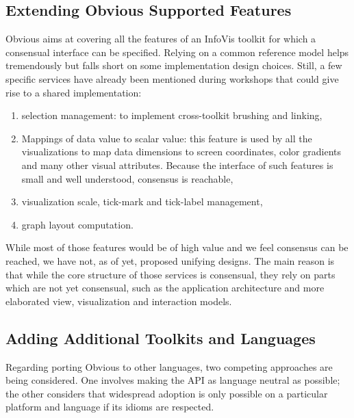 
\subsection{Extending Obvious Supported Features}

Obvious aims at covering all the features of an InfoVis toolkit for
which a consensual interface can be specified.  Relying on a common
reference model helps tremendously but falls short on some
implementation design choices.  Still, a few specific services have
already been mentioned during workshops that could give rise to a
shared implementation:
\begin{enumerate}[noitemsep,topsep=0pt]
\item selection management: to implement cross-toolkit brushing and
  linking,
\item Mappings of data value to scalar value: this feature is used by
  all the visualizations to map data dimensions to screen coordinates,
  color gradients and many other visual attributes. Because the
  interface of such features is small and well understood, consensus
  is reachable,
\item visualization scale, tick-mark and tick-label management,
\item graph layout computation.
\end{enumerate}

While most of those features would be of high value and we feel
consensus can be reached, we have not, as of yet, proposed unifying
designs.  The main reason is that while the core structure of those
services is consensual, they rely on parts which are not yet
consensual, such as the application architecture and more elaborated
view, visualization and interaction models.

\subsection{Adding Additional Toolkits and Languages}

Regarding porting Obvious to other languages, two competing approaches
are being considered.  One involves making the API as language neutral
as possible; the other considers that widespread adoption is only
possible on a particular platform and language if its idioms are
respected.

